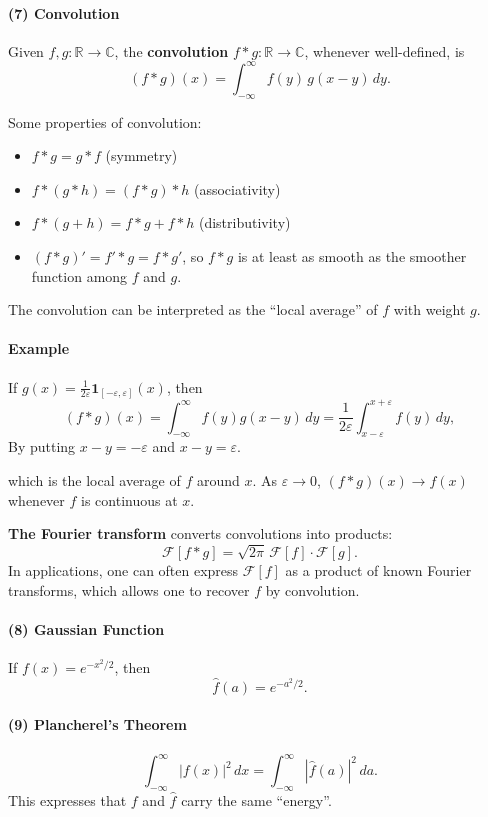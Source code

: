 \paragraph{(7) Convolution}
Given $f, g : \mathbb{R} \to \mathbb{C}$, the \textbf{convolution} $f * g : \mathbb{R} \to \mathbb{C}$, whenever well-defined, is
\[
(f * g)(x) = \int_{-\infty}^{\infty} f(y)\, g(x - y)\, dy.
\]

Some properties of convolution:
\begin{itemize}
  \item $f * g = g * f$ \hfill (symmetry)
  \item $f * (g * h) = (f * g) * h$ \hfill (associativity)
  \item $f * (g + h) = f * g + f * h$ \hfill (distributivity)
  \item $(f * g)' = f' * g = f * g'$, so $f * g$ is at least as smooth as the smoother function among $f$ and $g$.
\end{itemize}

The convolution can be interpreted as the ``local average'' of $f$ with weight $g$.

\paragraph{Example}
\begin{example}
If $g(x) = \frac{1}{2\varepsilon}\mathbf{1}_{[-\varepsilon,\varepsilon]}(x)$, then
\[
(f * g)(x) = \int_{- \infty}^{\infty} f(y)g(x-y) \, dy = \frac{1}{2\varepsilon}\int_{x-\varepsilon}^{x+\varepsilon} f(y)\, dy,
\]
By putting $x-y = - \varepsilon$ and $x - y = \varepsilon$.


which is the local average of $f$ around $x$. As $\varepsilon \to 0$, $(f * g)(x) \to f(x)$ whenever $f$ is continuous at $x$.
\end{example}

\textbf{The Fourier transform} converts convolutions into products:
\[
\mathcal{F}[f * g] = \sqrt{2\pi}\,\mathcal{F}[f]\cdot\mathcal{F}[g].
\]
In applications, one can often express $\mathcal{F}[f]$ as a product of known Fourier transforms, which allows one to recover $f$ by convolution.

\paragraph{(8) Gaussian Function}
If $f(x) = e^{-x^2/2}$, then
\[
\hat{f}(a) = e^{-a^2/2}.
\]

\paragraph{(9) Plancherel's Theorem}
\[
\int_{-\infty}^{\infty} |f(x)|^2\, dx = \int_{-\infty}^{\infty} |\hat{f}(a)|^2\, da.
\]
This expresses that $f$ and $\hat{f}$ carry the same ``energy''.

